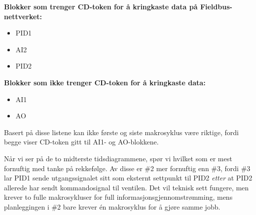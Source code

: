 \vskip 10pt

{\bf Blokker som trenger CD-token for å kringkaste data på Fieldbus-nettverket:}
\begin{itemize}
\item{} PID1
\item{} AI2
\item{} PID2
\end{itemize}

\vskip 10pt

{\bf Blokker som ikke trenger CD-token for å kringkaste data:}
\begin{itemize}
\item{} AI1
\item{} AO
\end{itemize}

Basert på disse listene kan ikke første og siste makrosyklus være riktige, fordi begge viser CD-token gitt til AI1- og AO-blokkene.

\vskip 10pt

Når vi ser på de to midterste tidsdiagrammene, spør vi hvilket som er mest fornuftig med tanke på rekkefølge. Av disse er \#2 mer fornuftig enn \#3, fordi \#3 lar PID1 sende utgangssignalet sitt som eksternt settpunkt til PID2 {\it etter} at PID2 allerede har sendt kommandosignal til ventilen. Det vil teknisk sett fungere, men krever to fulle makrosykluser for full informasjonsgjennomstrømming, mens planleggingen i \#2 bare krever én makrosyklus for å gjøre samme jobb.



